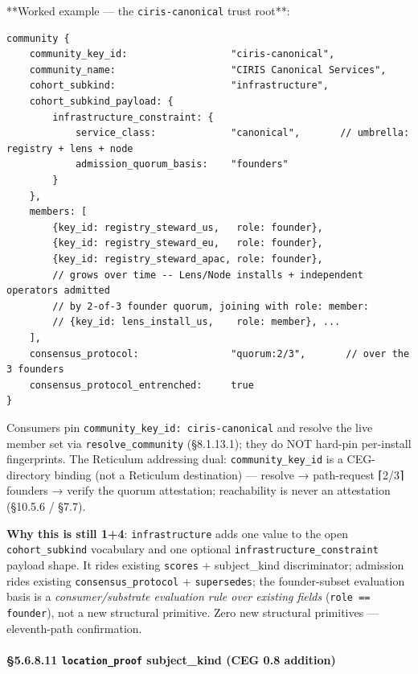 \documentclass[10pt]{article}
\begin{document}
**Worked example — the \texttt{ciris-canonical} trust root**:


\begin{lstlisting}
community {
    community_key_id:                  "ciris-canonical",
    community_name:                    "CIRIS Canonical Services",
    cohort_subkind:                    "infrastructure",
    cohort_subkind_payload: {
        infrastructure_constraint: {
            service_class:             "canonical",       // umbrella: registry + lens + node
            admission_quorum_basis:    "founders"
        }
    },
    members: [
        {key_id: registry_steward_us,   role: founder},
        {key_id: registry_steward_eu,   role: founder},
        {key_id: registry_steward_apac, role: founder},
        // grows over time -- Lens/Node installs + independent operators admitted
        // by 2-of-3 founder quorum, joining with role: member:
        // {key_id: lens_install_us,    role: member}, ...
    ],
    consensus_protocol:                "quorum:2/3",       // over the 3 founders
    consensus_protocol_entrenched:     true
}
\end{lstlisting}

Consumers pin \texttt{community\_key\_id: ciris-canonical} and resolve the live member set via \texttt{resolve\_community} (§8.1.13.1); they do NOT hard-pin per-install fingerprints. The Reticulum addressing dual: \texttt{community\_key\_id} is a CEG-directory binding (not a Reticulum destination) — resolve → path-request ⌈2/3⌉ founders → verify the quorum attestation; reachability is never an attestation (§10.5.6 / §7.7).


\textbf{Why this is still 1+4}: \texttt{infrastructure} adds one value to the open \texttt{cohort\_subkind} vocabulary and one optional \texttt{infrastructure\_constraint} payload shape. It rides existing \texttt{scores} + subject\_kind discriminator; admission rides existing \texttt{consensus\_protocol} + \texttt{supersedes}; the founder-subset evaluation basis is a \textit{consumer/substrate evaluation rule over existing fields} (\texttt{role == founder}), not a new structural primitive. Zero new structural primitives — eleventh-path confirmation.


\paragraph{§5.6.8.11 \texttt{location\_proof} subject\_kind (CEG 0.8 addition)}\mbox{}\\
\end{document}
